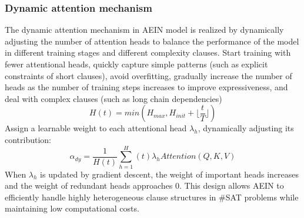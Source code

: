 \subsubsection{Dynamic attention mechanism}
The dynamic attention mechanism in AEIN model is realized by dynamically adjusting the number of 
attention heads to balance the performance of the model in different training stages and different 
complexity clauses. Start training with fewer attentional heads, quickly capture simple patterns 
(such as explicit constraints of short clauses), avoid overfitting, gradually increase the number of 
heads as the number of training steps increases to improve expressiveness, and deal with complex 
clauses (such as long chain dependencies) 
\begin{equation}
H(t)=min(H_{max},H_{init}+\lfloor\frac{t}{T}\rfloor)
\end{equation}
Assign a learnable weight to each attentional head \(\lambda_h\), dynamically adjusting its contribution:
\begin{equation}
\alpha_{dy}=\frac{1}{H(t)}\sum_{h=1}^H(t) \lambda_h Attention(Q,K,V)
\end{equation}
When \(\lambda_h\) is updated by gradient descent, the weight of important heads increases and 
the weight of redundant heads approaches 0.
This design allows AEIN to efficiently handle highly heterogeneous clause structures in \#SAT problems 
while maintaining low computational costs.

